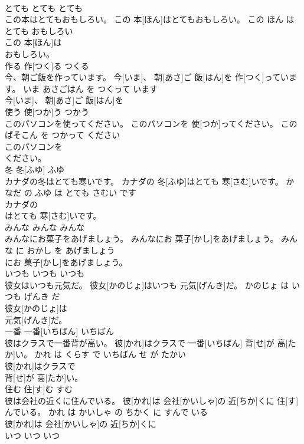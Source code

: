 \documentclass[8pt]{extreport}
\begin{document}
\begin{CJK}{UTF8}{min}
\\	とても	とても	とても	
\\	この本はとてもおもしろい。	この 本[ほん]はとてもおもしろい。	この ほん は とても おもしろい	
\\	この 本[ほん]は
\\	おもしろい。			
\\	作る	作[つく]る	つくる	
\\	今、朝ご飯を作っています。	今[いま]、 朝[あさ]ご 飯[はん]を 作[つく]っています。	いま あさごはん を つくって います	
\\	今[いま]、 朝[あさ]ご 飯[はん]を
\\	使う	使[つか]う	つかう	
\\	このパソコンを使ってください。	このパソコンを 使[つか]ってください。	この ぱそこん を つかって ください	
\\	このパソコンを
\\	ください。			
\\	冬	冬[ふゆ]	ふゆ	
\\	カナダの冬はとても寒いです。	カナダの 冬[ふゆ]はとても 寒[さむ]いです。	かなだ の ふゆ は とても さむい です	
\\	カナダの
\\	はとても 寒[さむ]いです。			
\\	みんな	みんな	みんな	
\\	みんなにお菓子をあげましょう。	みんなにお 菓子[かし]をあげましょう。	みんな に おかし を あげましょう	
\\	にお 菓子[かし]をあげましょう。			
\\	いつも	いつも	いつも	
\\	彼女はいつも元気だ。	彼女[かのじょ]はいつも 元気[げんき]だ。	かのじょ は いつも げんき だ	
\\	彼女[かのじょ]は
\\	元気[げんき]だ。			
\\	一番	一番[いちばん]	いちばん	
\\	彼はクラスで一番背が高い。	彼[かれ]はクラスで 一番[いちばん] 背[せ]が 高[たか]い。	かれ は くらす で いちばん せ が たかい	
\\	彼[かれ]はクラスで
\\	背[せ]が 高[たか]い。			
\\	住む	住[す]む	すむ	
\\	彼は会社の近くに住んでいる。	彼[かれ]は 会社[かいしゃ]の 近[ちか]くに 住[す]んでいる。	かれ は かいしゃ の ちかく に すんで いる	
\\	彼[かれ]は 会社[かいしゃ]の 近[ちか]くに
\\	いつ	いつ	いつ	

\end{CJK}
\end{document}
